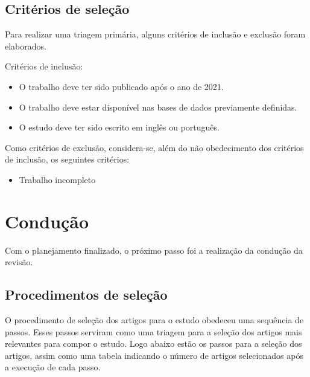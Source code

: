 \subsection{Critérios de seleção}

Para realizar uma triagem primária, alguns critérios de inclusão e exclusão foram elaborados.

Critérios de inclusão:
\begin{itemize}
	\item O trabalho deve ter sido publicado após o ano de 2021.
	
	\item O trabalho deve estar disponível nas bases de dados previamente definidas.
	
	\item O estudo deve ter sido escrito em inglês ou português.
	
\end{itemize}

Como critérios de exclusão, considera-se, além do não obedecimento dos critérios de inclusão, os seguintes critérios:
\begin{itemize}
	\item Trabalho incompleto
\end{itemize}

\section{Condução}

Com o planejamento finalizado, o próximo passo foi a realização da condução da revisão.

\subsection{Procedimentos de seleção}

O procedimento de seleção dos artigos para o estudo obedeceu uma sequência de passos. Esses passos serviram como uma triagem para a seleção dos artigos mais relevantes para compor o estudo. Logo abaixo estão os passos para a seleção dos artigos, assim como uma tabela indicando o número de artigos selecionados após a execução de cada passo.

